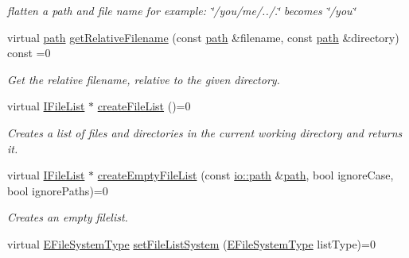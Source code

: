 \begin{DoxyCompactItemize}
\begin{DoxyCompactList}\small\item\em flatten a path and file name for example\+: \char`\"{}/you/me/../.\char`\"{} becomes \char`\"{}/you\char`\"{} \end{DoxyCompactList}\item 
virtual \hyperlink{namespaceirr_1_1io_ab1bdc45edb3f94d8319c02bc0f840ee1}{path} \hyperlink{classirr_1_1io_1_1IFileSystem_a1f4d7b1130556a6d0b8310125af82d91}{get\+Relative\+Filename} (const \hyperlink{namespaceirr_1_1io_ab1bdc45edb3f94d8319c02bc0f840ee1}{path} \&filename, const \hyperlink{namespaceirr_1_1io_ab1bdc45edb3f94d8319c02bc0f840ee1}{path} \&directory) const  =0\hypertarget{classirr_1_1io_1_1IFileSystem_a1f4d7b1130556a6d0b8310125af82d91}{}\label{classirr_1_1io_1_1IFileSystem_a1f4d7b1130556a6d0b8310125af82d91}

\begin{DoxyCompactList}\small\item\em Get the relative filename, relative to the given directory. \end{DoxyCompactList}\item 
virtual \hyperlink{classirr_1_1io_1_1IFileList}{I\+File\+List} $\ast$ \hyperlink{classirr_1_1io_1_1IFileSystem_ad5820e7664377c12015ea7a6c801f7f8}{create\+File\+List} ()=0
\begin{DoxyCompactList}\small\item\em Creates a list of files and directories in the current working directory and returns it. \end{DoxyCompactList}\item 
virtual \hyperlink{classirr_1_1io_1_1IFileList}{I\+File\+List} $\ast$ \hyperlink{classirr_1_1io_1_1IFileSystem_a4f8a69f557f2b7022f6cd7346c3e85d2}{create\+Empty\+File\+List} (const \hyperlink{namespaceirr_1_1io_ab1bdc45edb3f94d8319c02bc0f840ee1}{io\+::path} \&\hyperlink{namespaceirr_1_1io_ab1bdc45edb3f94d8319c02bc0f840ee1}{path}, bool ignore\+Case, bool ignore\+Paths)=0
\begin{DoxyCompactList}\small\item\em Creates an empty filelist. \end{DoxyCompactList}\item 
virtual \hyperlink{namespaceirr_1_1io_a22364f1caf06442a70f6198025af3fe9}{E\+File\+System\+Type} \hyperlink{classirr_1_1io_1_1IFileSystem_a767614d727f0b1ec0bc5fdaaf906169b}{set\+File\+List\+System} (\hyperlink{namespaceirr_1_1io_a22364f1caf06442a70f6198025af3fe9}{E\+File\+System\+Type} list\+Type)=0\hypertarget{classirr_1_1io_1_1IFileSystem_a767614d727f0b1ec0bc5fdaaf906169b}{}\label{classirr_1_1io_1_1IFileSystem_a767614d727f0b1ec0bc5fdaaf906169b}


\end{DoxyCompactItemize}
